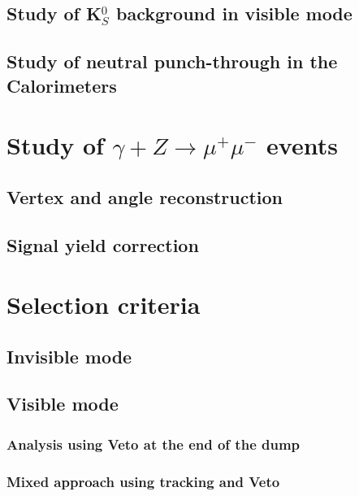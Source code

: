 \subsection{Study of K$^0_S$ background in visible mode}
\label{chapter3:sec:bkg-k0s}

\subsection{Study of neutral punch-through in the Calorimeters}
\label{chapter3:sec:bkg-neutrals}

\section{Study of $\gamma + Z \rightarrow \mu^+ \mu^-$ events }
\label{chapter3:sec:dimuons}


\subsection{Vertex and angle reconstruction}
\label{chapter3:sec:dimuons-reco}

\subsection{Signal yield correction}
\label{chapter3:sec:dimuons-sig-corr}

\section{Selection criteria}
\label{chapter3:sec:selection-criteria}

\subsection{Invisible mode}
\label{chapter3:sec:selection-criteria-invis}

\subsection{Visible mode}
\label{chapter3:sec:selection-criteria-vis}

\subsubsection{Analysis using Veto at the end of the dump}
\label{chapter3:sec:vis-mode-veto}

\subsubsection{Mixed approach using tracking and Veto}
\label{chapter3:sec:vis-mode-tracking}

